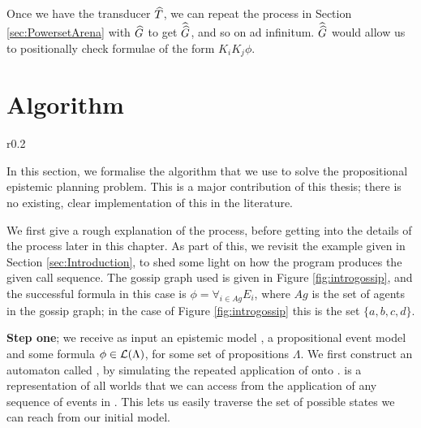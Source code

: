 \documentclass[10pt, a4paper]{report}
\begin{document}
Once we have the transducer $\widehat{T}$, we can repeat the process in Section
\ref{sec:PowersetArena} with $\widehat{G}$ to get $\widehat{\widehat{G}}$, and so on ad
infinitum. $\widehat{\widehat{G}}$ would allow us to positionally check formulae of the
form $K_i K_j \phi$.

\newpage

\chapter{Algorithm}

\begin{wrapfigure}{r}{0.2\textwidth}
  \centering
  \caption{}
  \label{fig:introgossip}
\end{wrapfigure}

In this section, we formalise the algorithm that we use to solve the
propositional epistemic planning problem. This is a major contribution of this
thesis; there is no existing, clear implementation of this in the literature.

We first give a rough explanation of the process, before getting into the
details of the process later in this chapter. As part of this, we revisit the
example given in Section \ref{sec:Introduction}, to shed some light on how the
program produces the given call sequence. The gossip graph used is given in
Figure \ref{fig:introgossip}, and the successful formula in this case is $\phi =
\forall_{i \in Ag} E_i$, where $Ag$ is the set of agents in the gossip graph; in
the case of Figure \ref{fig:introgossip} this is the set $\{a, b, c, d\}$. 

\textbf{Step one}; we receive as input an epistemic model , a
propositional event model  and some formula $\phi \in \mathcal{L}(\Lambda)$,
for some set of propositions $\Lambda$. We first construct an automaton called
\mestar, by simulating the repeated application of  onto . \mestar
is a representation of all worlds that we can access from the application of any
sequence of events in . This lets us easily traverse the set of possible
states we can reach from our initial model.
\end{document}
